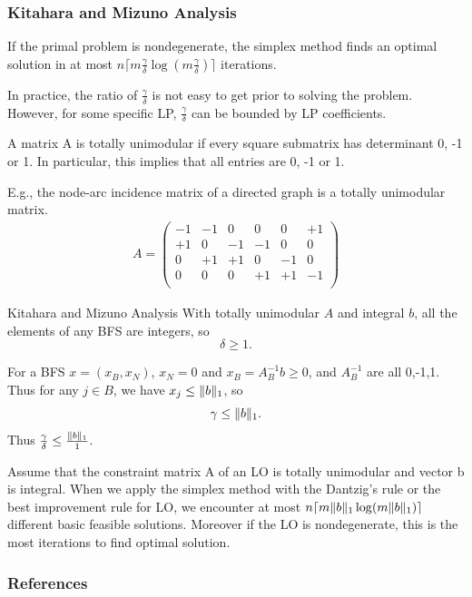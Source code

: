 \documentclass{beamer}
\DeclarePairedDelimiter{\norm}{\lVert}{\rVert}
\begin{document}
\begin{frame}
\frametitle{Kitahara and Mizuno Analysis}
\begin{corollary}
 If the primal problem is nondegenerate, the simplex method finds an optimal solution in at most $n\lceil m \frac{\gamma}{\delta}\log(m\frac{\gamma}{\delta})\rceil$ iterations.
\end{corollary}
In practice, the ratio of $\frac{\gamma}{\delta}$ is not easy to get prior to solving the problem. However, for some specific LP, $\frac{\gamma}{\delta}$ can be bounded by LP coefficients. 
\begin{definition}
A matrix A is totally unimodular if every square submatrix has determinant 0, -1 or 1. In particular, this implies that all entries are 0, -1 or 1.
\end{definition}
E.g., the node-arc incidence matrix of a directed graph is a totally unimodular matrix.
\begin{align*}
A = \begin{pmatrix}
-1 & -1& 0& 0& 0& +1\\
+1 & 0& -1& -1& 0& 0\\
0 & +1& +1& 0& -1& 0\\
0 & 0& 0& +1& +1& -1\\
\end{pmatrix}
\end{align*}
\end{frame}


\begin{frame}{Kitahara and Mizuno Analysis}
With totally unimodular $A$ and integral $b$, all the elements of any BFS are integers, so $$\delta \ge 1.$$ 

For a BFS $x = (x_B, x_N)$, $x_N = 0$ and $x_B = A_B^{-1}b \ge 0$, and $A_B^{-1}$ are all 0,-1,1. Thus for any $j \in B$, we have $x_j \le \norm{b}_1$, so $$\gamma \le \norm{b}_1.$$ Thus $\frac{\gamma}{\delta} \le \frac{\norm{b}_1}{1}$. 
\begin{corollary}
Assume that the constraint matrix A of an LO is totally unimodular and vector b is integral. When we apply the simplex method with the Dantzig's rule or the best improvement rule for LO, we encounter at most $n\lceil m \norm{b}_1\log(m\norm{b}_1)\rceil$ different basic feasible solutions. Moreover if the LO is nondegenerate, this is the most iterations to find optimal solution. 
\end{corollary}

\end{frame}



\begin{frame}
\frametitle{References}
\printbibliography
\end{frame}

\end{document}

